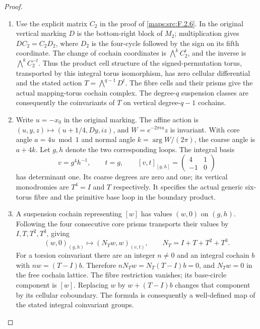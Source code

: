 \documentclass[11pt,a4paper]{article}
\theoremstyle{definition}
\begin{document}
\begin{proof}
\begin{enumerate}[label=\arabic*.]
\item Use the explicit matrix $C_2$ in the proof of
\cref{maps:src:F.2.6}.  In the original vertical marking $D$ is the
bottom-right block of $M_2$; multiplication gives
$DC_2=C_2D_2$, where $D_2$ is the four-cycle followed by the sign
on its fifth coordinate.  The change of cochain coordinates is
$\bigwedge^kC_2^t$, and the inverse is $\bigwedge^kC_2^{-t}$.
Thus the product cell structure of the signed-permutation torus,
transported by this integral torus isomorphism, has zero cellular
differential and the stated action $T=\bigwedge^{q-1}D^t$.
The fibre cells and their prisms give the actual mapping-torus
cochain complex.  The degree-$q$ suspension classes are consequently
the coinvariants of $T$ on vertical degree-$q-1$ cochains.

\item Write $u=-x_0$ in the original marking.  The affine action is
$(u,y,z)\mapsto(u+1/4,Dy,iz)$, and
$W=e^{-2\pi i u}z$ is invariant.  With core angle $a=4u\bmod1$
and normal angle $k=\arg W/(2\pi)$, the coarse angle is $a+4k$.
Let $g,h$ denote the two corresponding loops.  The integral basis
\[
 v=g^4h^{-1},\qquad t=g,
 \qquad [v,t]_{[g,h]}=\begin{pmatrix}4&1\\-1&0\end{pmatrix}
\]
has determinant one.  Its coarse degrees are zero and one; its
vertical monodromies are $T^4=I$ and $T$ respectively.
It specifies the actual generic six-torus fibre and the primitive
base loop in the boundary product.

\item A suspension cochain representing $[w]$ has values $(w,0)$
on $(g,h)$.  Following the four consecutive core prisms transports
their values by $I,T,T^2,T^3$, giving
\[
 (w,0)_{(g,h)}\longmapsto(N_Tw,w)_{(v,t)},
 \qquad N_T=I+T+T^2+T^3.
 \tag{FT.1}\label{maps:eq:FT.1}
\]
For a torsion coinvariant there are an integer $n\ne0$ and an
integral cochain $b$ with $nw=(T-I)b$.  Therefore
$nN_Tw=N_T(T-I)b=0$, and $N_Tw=0$ in the free cochain lattice.
The fibre restriction vanishes; its base-circle component is $[w]$.
Replacing $w$ by $w+(T-I)b$ changes that component by its cellular
coboundary.  The formula is consequently a well-defined map of the
stated integral coinvariant groups.


\end{enumerate}
\end{proof}
\end{document}
